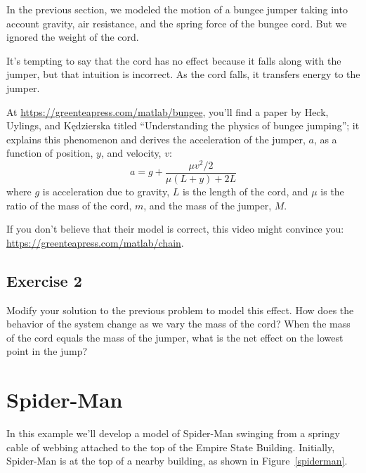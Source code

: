 
In the previous section, we modeled the motion of a bungee jumper taking into account gravity, air resistance, and the spring force of the bungee cord.  But we ignored the weight of the cord.


It's tempting to say that the cord has no effect because it falls along with the jumper, but that intuition is incorrect.  As the cord falls, it transfers energy to the jumper.


At \url{https://greenteapress.com/matlab/bungee}, you'll find a paper by Heck, Uylings, and Kędzierska titled ``Understanding the physics of bungee jumping''; it explains this phenomenon and derives the acceleration of the jumper, $a$, as a function of position, $y$, and velocity, $v$:
%
\[ a = g + \frac{\mu v^2/2}{\mu(L+y) + 2L} \] 
%
where $g$ is acceleration due to gravity, $L$ is the length of the cord, and $\mu$ is the ratio of the mass of the cord, $m$, and the mass of the jumper, $M$.

If you don't believe that their model is correct, this video might convince you: \url{https://greenteapress.com/matlab/chain}.

\subsection{Exercise 2}

Modify your solution to the previous problem to model this effect.  How does the behavior of the system change as we vary the mass of the cord?  When the mass of the cord equals the mass of the jumper, what is the net effect on the lowest point in the jump?


\section{Spider-Man}

In this example we'll develop a model of Spider-Man swinging from a
springy cable of webbing attached to the top of the Empire State
Building.  Initially, Spider-Man is at the top of a nearby building, as
shown in \linebreak Figure~\ref{spiderman}.


